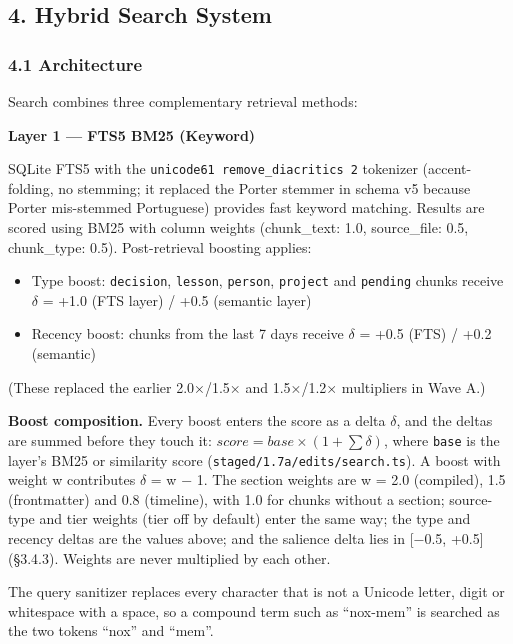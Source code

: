 \documentclass[
]{article}
\providecommand{\tightlist}{%
  \setlength{\itemsep}{0pt}\setlength{\parskip}{0pt}}
\begin{document}
\subsection{4. Hybrid Search System}\label{hybrid-search-system}

\subsubsection{4.1 Architecture}\label{architecture}

Search combines three complementary retrieval methods:

\textbf{Layer 1 --- FTS5 BM25 (Keyword)}

SQLite FTS5 with the \texttt{unicode61\ remove\_diacritics\ 2} tokenizer
(accent-folding, no stemming; it replaced the Porter stemmer in schema
v5 because Porter mis-stemmed Portuguese) provides fast keyword
matching. Results are scored using BM25 with column weights
(chunk\_text: 1.0, source\_file: 0.5, chunk\_type: 0.5). Post-retrieval
boosting applies:

\begin{itemize}
\tightlist
\item
  Type boost: \texttt{decision}, \texttt{lesson}, \texttt{person},
  \texttt{project} and \texttt{pending} chunks receive \(\delta\) = +1.0
  (FTS layer) / +0.5 (semantic layer)
\item
  Recency boost: chunks from the last 7 days receive \(\delta\) = +0.5
  (FTS) / +0.2 (semantic)
\end{itemize}

(These replaced the earlier 2.0×/1.5× and 1.5×/1.2× multipliers in Wave
A.)

\textbf{Boost composition.} Every boost enters the score as a delta
\(\delta\), and the deltas are summed before they touch it:
\(\mathit{score} = \mathit{base} \times (1 + \sum\delta)\), where
\texttt{base} is the layer's BM25 or similarity score
(\texttt{staged/1.7a/edits/search.ts}). A boost with weight w
contributes \(\delta\) = w − 1. The section weights are w = 2.0
(compiled), 1.5 (frontmatter) and 0.8 (timeline), with 1.0 for chunks
without a section; source-type and tier weights (tier off by default)
enter the same way; the type and recency deltas are the values above;
and the salience delta lies in {[}−0.5, +0.5{]} (§3.4.3). Weights are
never multiplied by each other.

The query sanitizer replaces every character that is not a Unicode
letter, digit or whitespace with a space, so a compound term such as
``nox-mem'' is searched as the two tokens ``nox'' and ``mem''.
\end{document}
